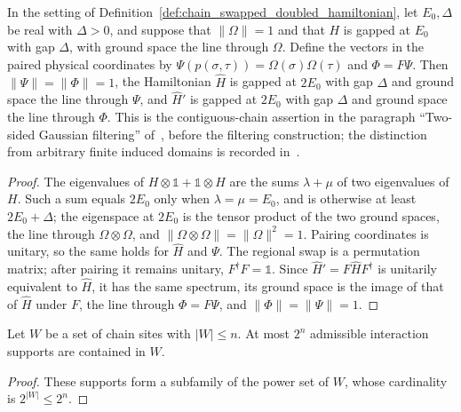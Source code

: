 \begin{lemma}
    \label{thm:chain_doubled_swapped_ground_gap}
    \leanok
    In the setting of Definition~\ref{def:chain_swapped_doubled_hamiltonian},
    let $E_0,\Delta$ be real with $\Delta>0$, and suppose that $\|\Omega\|=1$
    and that $H$ is gapped at $E_0$ with gap $\Delta$, with ground space the
    line through $\Omega$.
    Define the vectors in the paired physical coordinates by
    $\Psi(p(\sigma,\tau))=\Omega(\sigma)\Omega(\tau)$ and
    $\Phi=F\Psi$. Then $\|\Psi\|=\|\Phi\|=1$, the Hamiltonian $\widehat H$ is
    gapped at $2E_0$ with gap $\Delta$ and ground space the line through
    $\Psi$, and $\widehat H'$ is gapped at $2E_0$ with gap $\Delta$ and ground
    space the line through $\Phi$.
    This is the contiguous-chain assertion in the paragraph
    ``Two-sided Gaussian filtering'' of~\cite{TNLean2026OneDimensional},
    before the filtering construction; the distinction from arbitrary
    finite induced domains is recorded
    in~\cite{gap:tnlean_one_dimensional_connected_domain_scope}.
\end{lemma}
\begin{proof}
    \leanok
    The eigenvalues of $H\otimes\mathbb 1+\mathbb 1\otimes H$ are the sums
    $\lambda+\mu$ of two eigenvalues of $H$. Such a sum equals $2E_0$ only
    when $\lambda=\mu=E_0$, and is otherwise at least $2E_0+\Delta$; the
    eigenspace at $2E_0$ is the tensor product of the two ground spaces, the
    line through $\Omega\otimes\Omega$, and
    $\|\Omega\otimes\Omega\|=\|\Omega\|^2=1$. Pairing coordinates is
    unitary, so the same holds for $\widehat H$ and $\Psi$.
    The regional swap is a permutation matrix; after pairing it remains
    unitary, $F^\dagger F=\mathbb 1$. Since $\widehat H'=F\widehat HF^\dagger$
    is unitarily equivalent to $\widehat H$, it has the same spectrum, its
    ground space is the image of that of $\widehat H$ under $F$, the line
    through $\Phi=F\Psi$, and $\|\Phi\|=\|\Psi\|=1$.
\end{proof}

\begin{lemma}
    \label{thm:chain_supports_in_window}
    \leanok
    Let $W$ be a set of chain sites with $|W|\le n$. At most $2^n$
    admissible interaction supports are contained in $W$.
\end{lemma}
\begin{proof}\leanok
    These supports form a subfamily of the power set of $W$, whose
    cardinality is $2^{|W|}\le2^n$.
\end{proof}


